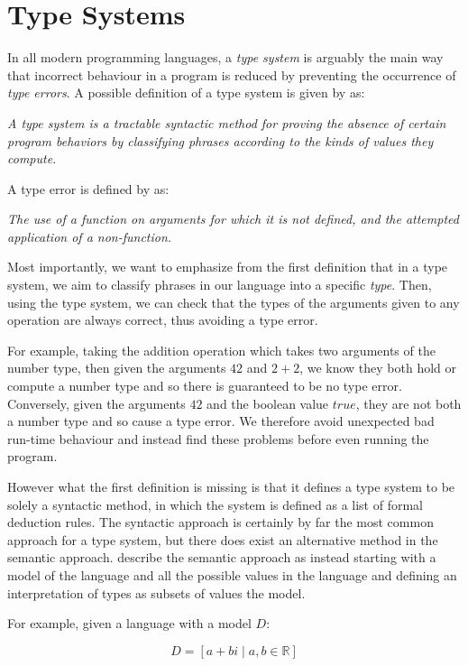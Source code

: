 \documentclass{l4proj}
\begin{document}
\section{Type Systems}

In all modern programming languages, a \emph{type system} is arguably the main way that incorrect behaviour in a program is reduced by preventing the occurrence of \emph{type errors}.
A possible definition of a type system is given by \citet{Pierce2002} as:

\emph{A type system is a tractable syntactic method for proving the absence of certain program behaviors by classifying phrases according to the kinds of values they compute.}

A type error is defined by \citet{wright1994} as:

\emph{The use of a function on arguments for which it is not defined, and the attempted application of a non-function.}

Most importantly, we want to emphasize from the first definition that in a type system, we aim to classify phrases in our language into a specific \emph{type}.
Then, using the type system, we can check that the types of the arguments given to any operation are always correct, thus avoiding a type error.

For example, taking the addition operation which takes two arguments of the number type, then given the arguments $42$ and $2 + 2$, we know they both hold or compute a number type and so there is guaranteed to be no type error.
Conversely, given the arguments $42$ and the boolean value $true$, they are not both a number type and so cause a type error.
We therefore avoid unexpected bad run-time behaviour and instead find these problems before even running the program.

However what the first definition is missing is that it defines a type system to be solely a syntactic method, in which the system is defined as a list of formal deduction rules.
The syntactic approach is certainly by far the most common approach for a type system, but there does exist an alternative method in the semantic approach.
\citet{Frisch2002} describe the semantic approach as instead starting with a model of the language and all the possible values in the language and defining an interpretation of types as subsets of values the model.

For example, given a language with a model $D$:

\begin{equation*}
    D = \left[ a + bi \mid a, b \in \mathbb{R}\right]
\end{equation*}
\end{document}
